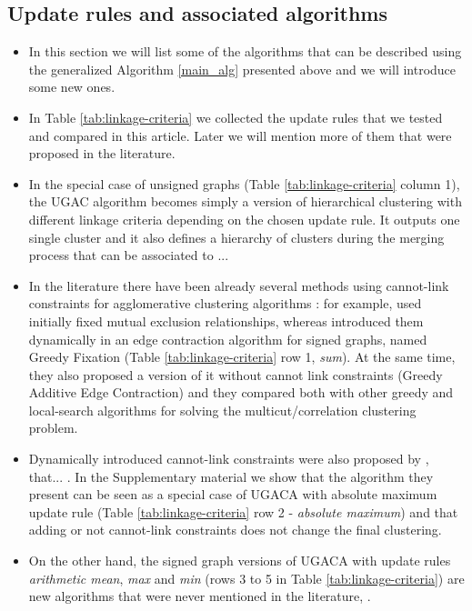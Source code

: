 \subsection{Update rules and associated algorithms}
\begin{itemize}
\item In this section we will list some of the algorithms that can be described using the generalized Algorithm \ref{main_alg} presented above and we will introduce some new ones.
\item In Table \ref{tab:linkage-criteria} we collected the update rules that we tested and compared in this article. Later we will mention more of them that were proposed in the literature.
\item In the special case of unsigned graphs (Table \ref{tab:linkage-criteria} column 1), the UGAC algorithm becomes simply a version of hierarchical clustering with different linkage criteria depending on the chosen update rule. It outputs one single cluster and it also defines a hierarchy of clusters during the merging process that can be associated to ...   
\item In the literature there have been already several methods using cannot-link constraints for agglomerative clustering algorithms : for example, \cite{malmberg2011generalized} used initially fixed mutual exclusion relationships, whereas \cite{levinkov2017comparative} introduced them dynamically in an edge contraction algorithm for signed graphs, named Greedy Fixation (Table \ref{tab:linkage-criteria} row 1, \emph{sum}). At the same time, they also proposed a version of it without cannot link constraints (Greedy Additive Edge Contraction) and they compared both with other greedy and local-search algorithms for solving the multicut/correlation clustering problem.
\item Dynamically introduced cannot-link constraints were also proposed by \cite{wolf2018mutex}, that... . In the Supplementary material we show that the algorithm they present can be seen as a special case of UGACA with absolute maximum update rule (Table \ref{tab:linkage-criteria} row 2 - \emph{absolute maximum}) and that adding or not cannot-link constraints does not change the final clustering.
\item On the other hand, the signed graph versions of UGACA with update rules \emph{arithmetic mean}, \emph{max} and \emph{min} (rows 3 to 5 in Table \ref{tab:linkage-criteria}) are new algorithms that were never mentioned in the literature, .

\end{itemize}
